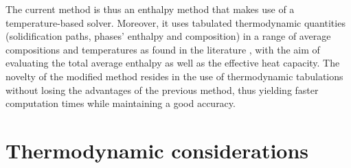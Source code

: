 The current method is thus an enthalpy method that makes use of a temperature-based solver. 
Moreover, it uses tabulated thermodynamic quantities (solidification paths, phases' enthalpy  and composition) 
in a range of average compositions and temperatures as found in the literature 
\citep{dore_modelling_2000,thuinet_prediction_2004,du_modeling_2007}, 
with the aim of evaluating the total average enthalpy as well as the effective heat capacity. 
The novelty of the modified method resides in the use of thermodynamic tabulations without losing 
the advantages of the previous method, thus yielding faster computation times while maintaining a 
good accuracy.
%
%
\section{Thermodynamic considerations}
%
